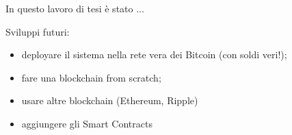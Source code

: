 In questo lavoro di tesi è stato ...

Sviluppi futuri:
\begin{itemize}
    \item deployare il sistema nella rete vera dei Bitcoin (con soldi veri!);
    \item fare una blockchain from scratch;
    \item usare altre blockchain (Ethereum, Ripple)
    \item aggiungere gli Smart Contracts
\end{itemize}